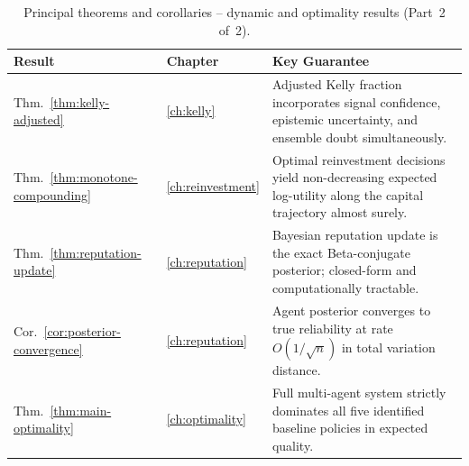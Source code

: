 \documentclass[12pt,openany]{book}
\numberwithin{equation}{chapter}
\theoremstyle{plain}
\theoremstyle{definition}
\theoremstyle{remark}
\numberwithin{equation}{chapter}
\theoremstyle{plain}
\begin{document}
\begin{table}[H]
\centering
\caption{Principal theorems and corollaries -- dynamic and optimality results (Part~2 of~2).}
\label{tab:summary-results-2}
\small
\begin{tabularx}{\linewidth}{@{} l l X @{}}
\toprule
\textbf{Result} & \textbf{Chapter} & \textbf{Key Guarantee} \\
\midrule
Thm.~\ref{thm:kelly-adjusted}
  & \ref{ch:kelly}
  & Adjusted Kelly fraction incorporates signal confidence,
    epistemic uncertainty, and ensemble doubt simultaneously. \\[3pt]
Thm.~\ref{thm:monotone-compounding}
  & \ref{ch:reinvestment}
  & Optimal reinvestment decisions yield non-decreasing expected
    log-utility along the capital trajectory almost surely. \\[3pt]
Thm.~\ref{thm:reputation-update}
  & \ref{ch:reputation}
  & Bayesian reputation update is the exact Beta-conjugate
    posterior; closed-form and computationally tractable. \\[3pt]
Cor.~\ref{cor:posterior-convergence}
  & \ref{ch:reputation}
  & Agent posterior converges to true reliability at rate
    $O(1/\sqrt{n})$ in total variation distance. \\[3pt]
Thm.~\ref{thm:main-optimality}
  & \ref{ch:optimality}
  & Full multi-agent system strictly dominates all five
    identified baseline policies in expected quality. \\
\bottomrule
\end{tabularx}
\end{table}
\end{document}
